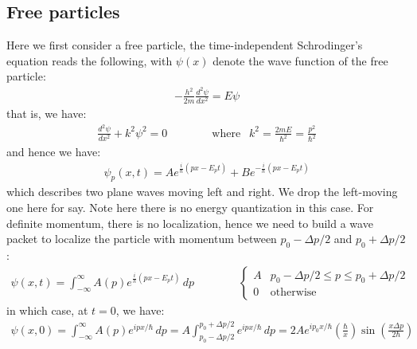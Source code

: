 \documentclass[11pt]{article}
\theoremstyle{break}
\theoremstyle{break}
\begin{document}
\subsection{Free particles}
Here we first consider a free particle, the time-independent Schrodinger's equation reads the following, with $\psi(x)$ denote the wave function of the free particle:
\begin{align*}
-\frac{h^2}{2m}\frac{d^2\psi}{dx^2} = E\psi
\end{align*}
that is, we have:
\begin{align*}
\frac{d^2\psi}{dx^2} + k^2 \psi^2 = 0 \qquad\qquad\text{where }\ \ k^2=\frac{2mE}{\hbar^2} = \frac{p^2}{\hbar^2}
\end{align*}
and hence we have:
\begin{align*}
\psi_p(x,t) = Ae^{\frac{i}{\hbar}(px - E_p t)}+Be^{-\frac{i}{\hbar}(px - E_p t)}
\end{align*}
which describes two plane waves moving left and right. We drop the left-moving one here for say. Note here there is no energy quantization in this case. For definite momentum, there is no localization, hence we need to build a wave packet to localize the particle with momentum between $p_0 - \Delta p/2$ and $p_0 +\Delta p/2$:
\begin{align*}
\psi(x,t) = \int_{-\infty}^\infty A(p) e^{\frac{i}{h}(px-E_p t)}\, dp \qquad\qquad \begin{cases}
A & p_0-\Delta p/2 \leq p \leq p_0 + \Delta p/2\\
0 & \text{otherwise}
\end{cases}
\end{align*}
in which case, at $t=0$, we have:
\begin{align*}
\psi(x,0) = \int_{-\infty}^\infty A(p) e^{ipx/\hbar}\, dp = A\int_{p_0 - \Delta p /2}^{p_0+\Delta p/2} e^{ipx/\hbar}\, dp = 2Ae^{ip_0 x/\hbar}\left( \frac{\hbar}{x}\right) \sin\left( \frac{x\Delta p}{2\hbar}\right)
\end{align*}
\end{document}
